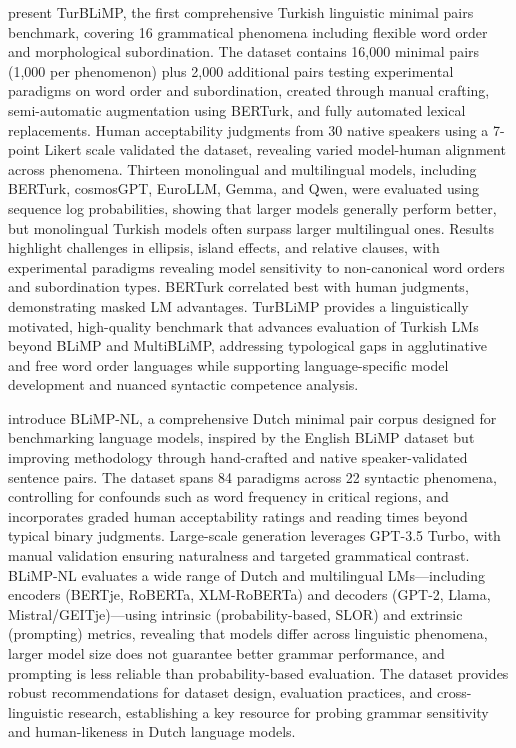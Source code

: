 \documentclass[acmsmall]{acmart}
\begin{document}
\citep{başar2025turblimpturkishbenchmarklinguistic} present TurBLiMP, the first comprehensive Turkish linguistic minimal pairs benchmark, covering 16 grammatical phenomena including flexible word order and morphological subordination. The dataset contains 16,000 minimal pairs (1,000 per phenomenon) plus 2,000 additional pairs testing experimental paradigms on word order and subordination, created through manual crafting, semi-automatic augmentation using BERTurk, and fully automated lexical replacements. Human acceptability judgments from 30 native speakers using a 7-point Likert scale validated the dataset, revealing varied model-human alignment across phenomena. Thirteen monolingual and multilingual models, including BERTurk, cosmosGPT, EuroLLM, Gemma, and Qwen, were evaluated using sequence log probabilities, showing that larger models generally perform better, but monolingual Turkish models often surpass larger multilingual ones. Results highlight challenges in ellipsis, island effects, and relative clauses, with experimental paradigms revealing model sensitivity to non-canonical word orders and subordination types. BERTurk correlated best with human judgments, demonstrating masked LM advantages. TurBLiMP provides a linguistically motivated, high-quality benchmark that advances evaluation of Turkish LMs beyond BLiMP and MultiBLiMP, addressing typological gaps in agglutinative and free word order languages while supporting language-specific model development and nuanced syntactic competence analysis.

\citep{frank_suijkerbuijk_prins_de_heer_kloots_zuidema_2025} introduce BLiMP-NL, a comprehensive Dutch minimal pair corpus designed for benchmarking language models, inspired by the English BLiMP dataset but improving methodology through hand-crafted and native speaker-validated sentence pairs. The dataset spans 84 paradigms across 22 syntactic phenomena, controlling for confounds such as word frequency in critical regions, and incorporates graded human acceptability ratings and reading times beyond typical binary judgments. Large-scale generation leverages GPT-3.5 Turbo, with manual validation ensuring naturalness and targeted grammatical contrast. BLiMP-NL evaluates a wide range of Dutch and multilingual LMs—including encoders (BERTje, RoBERTa, XLM-RoBERTa) and decoders (GPT-2, Llama, Mistral/GEITje)—using intrinsic (probability-based, SLOR) and extrinsic (prompting) metrics, revealing that models differ across linguistic phenomena, larger model size does not guarantee better grammar performance, and prompting is less reliable than probability-based evaluation. The dataset provides robust recommendations for dataset design, evaluation practices, and cross-linguistic research, establishing a key resource for probing grammar sensitivity and human-likeness in Dutch language models.
\end{document}
